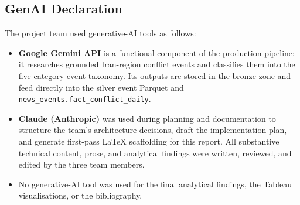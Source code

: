 \documentclass[11pt,a4paper]{article}
\begin{document}
\subsection{GenAI Declaration}
\label{sec:genai_declaration}

The project team used generative-AI tools as follows:

\begin{itemize}
  \item \textbf{Google Gemini API} is a functional component of the
        production pipeline: it researches grounded Iran-region
        conflict events and classifies them into the five-category
        event taxonomy. Its outputs are stored in the bronze zone and
        feed directly into the silver event Parquet and
        \texttt{news\_events.fact\_conflict\_daily}.
  \item \textbf{Claude (Anthropic)} was used during planning and
        documentation to structure the team's architecture decisions,
        draft the implementation plan, and generate first-pass LaTeX
        scaffolding for this report. All substantive technical
        content, prose, and analytical findings were written,
        reviewed, and edited by the three team members.
  \item No generative-AI tool was used for the final analytical
        findings, the Tableau visualisations, or the bibliography.
\end{itemize}

\newpage
\end{document}
